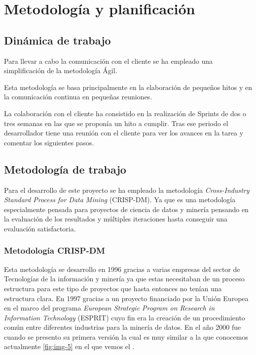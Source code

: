 \chapter{Metodología y planificación}


\section{Dinámica de trabajo}

Para llevar a cabo la comunicación con el cliente se ha empleado una simplificación de la metodología Ágil.

Esta metodología se basa principalmente en la elaboración de pequeños hitos y en la comunicación continua en pequeñas reuniones.

La colaboración con el cliente ha consistido en la realización de Sprints de dos o tres semanas en las que se proponía un hito a cumplir. Tras ese periodo el desarrollador tiene una reunión con el cliente para ver los avances en la tarea y comentar los siguientes pasos.

\section{Metodología de trabajo}

Para el desarrollo de este proyecto se ha empleado la metodología \textit{Cross-Industry Standard Process for Data Mining} (CRISP-DM). Ya que es una metodología especialmente pensada para proyectos de ciencia de datos y minería pensando en la evaluación de los resultados y múltiples iteraciones hasta conseguir una evaluación satisfactoria.

\subsection{Metodología CRISP-DM}

Esta metodología se desarrollo en 1996 gracias a varias empresas del sector de Tecnologías de la información y minería ya que estas necesitaban de un proceso estructura para este tipo de proyectos que hasta entonces no tenían una estructura clara. En 1997 gracias a un proyecto financiado por la Unión Europea en el marco del programa \textit{European Strategic Program on Research in Information Technology} (ESPRIT) cuyo fin era la creación de un procedimiento común entre diferentes industrias para la minería de datos. En el año 2000 fue cuando se presento su primera versión la cual es muy similar a la que conocemos actualmente \ref{fig:img-5} en el que vemos el  \cite{CrispDM} \cite{CrispDMWiki}.

